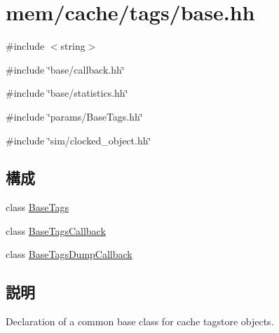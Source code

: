 \hypertarget{mem_2cache_2tags_2base_8hh}{
\section{mem/cache/tags/base.hh}
\label{mem_2cache_2tags_2base_8hh}
}
{\ttfamily \#include $<$string$>$}\par
{\ttfamily \#include \char`\"{}base/callback.hh\char`\"{}}\par
{\ttfamily \#include \char`\"{}base/statistics.hh\char`\"{}}\par
{\ttfamily \#include \char`\"{}params/BaseTags.hh\char`\"{}}\par
{\ttfamily \#include \char`\"{}sim/clocked\_\-object.hh\char`\"{}}\par
\subsection*{構成}
\begin{DoxyCompactItemize}
\item 
class \hyperlink{classBaseTags}{BaseTags}
\item 
class \hyperlink{classBaseTagsCallback}{BaseTagsCallback}
\item 
class \hyperlink{classBaseTagsDumpCallback}{BaseTagsDumpCallback}
\end{DoxyCompactItemize}


\subsection{説明}
Declaration of a common base class for cache tagstore objects. 
